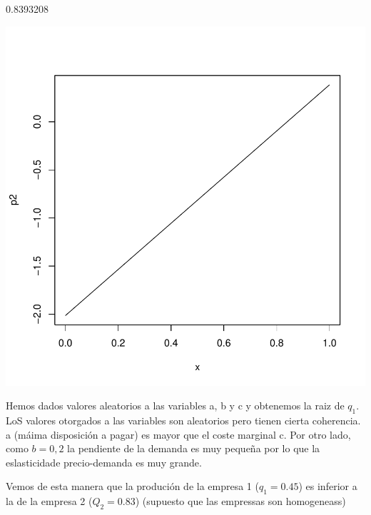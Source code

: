 \documentclass{article}
\begin{document}
\begin{Schunk}
\begin{Soutput}
[1] 0.8393208
\end{Soutput}
\end{Schunk}
\includegraphics{PUTAPRUEBA-004}



Hemos dados valores aleatorios a las variables a, b y c y obtenemos la raiz de $q_1$. LoS valores otorgados a las variables son aleatorios pero tienen cierta coherencia. a (m\'aima disposici\'on a pagar) es mayor que el coste marginal c. Por otro lado, como $b=0,2$ la pendiente de la demanda es muy pequeña por lo que la eslasticidade precio-demanda es muy grande.

Vemos de esta manera que la produci\'on de la empresa 1 ($q_1=0.45$) es inferior a la de la empresa 2 ($Q_2=0.83$) (supuesto que las empressas son homogeneass)
\end{document}
